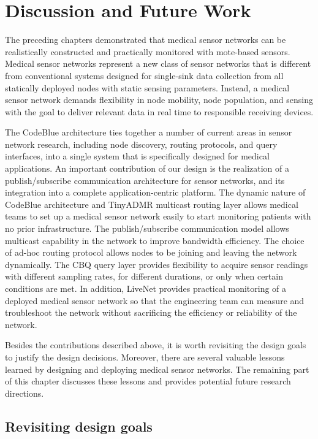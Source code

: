 \chapter{Discussion and Future Work}
\label{chap-lessons}
\label{sec-cb-future}
\label{sec-cb-futurework}

The preceding chapters demonstrated that medical sensor networks can be
realistically constructed and practically monitored with mote-based 
sensors. Medical sensor networks represent a new class of sensor networks that
is different from conventional systems designed for
single-sink data collection from all statically deployed nodes with
static sensing parameters. Instead, a medical sensor network demands
flexibility in node mobility, node population, and sensing with the goal to
deliver relevant data in real time to responsible receiving devices. 

The CodeBlue architecture ties
together a number of current areas in sensor network research, including node
discovery, routing protocols, and query interfaces, into a single system that
is specifically designed for medical applications. An important contribution
of our design is the realization of a publish/subscribe communication
architecture for sensor networks, and its integration into a complete
application-centric platform.
The dynamic nature of CodeBlue architecture and TinyADMR multicast routing
layer allows medical teams to set up a medical sensor network easily to start
monitoring patients with no
prior infrastructure. The
publish/subscribe communication model allows multicast capability in the
network to improve bandwidth efficiency. The choice of ad-hoc routing protocol
allows nodes to be joining and leaving the network
dynamically. The CBQ query layer provides flexibility to acquire sensor
readings with different sampling rates, for different durations, or only when
certain conditions are met. In addition, LiveNet provides practical
monitoring of a deployed medical sensor network so that the engineering team
can measure and troubleshoot the network without sacrificing the efficiency or
reliability of the network.

Besides the contributions described above, it is worth revisiting the design
goals to justify the design decisions. Moreover, there are several valuable
lessons learned by designing and deploying medical sensor networks. The
remaining part of this chapter discusses these lessons and provides potential
future research directions.

\section{Revisiting design goals}

